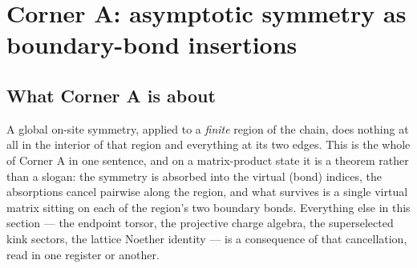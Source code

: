 
\providecommand{\PGL}{\operatorname{PGL}}      %
\providecommand{\PU}{\operatorname{PU}}        %
\providecommand{\GLie}{\operatorname{GL}}      %
\providecommand{\Ug}{\operatorname{U}}         %
\providecommand{\Hcoh}{\operatorname{H}}       %
\providecommand{\bond}[2]{(#1\,|\,#2)}         %
\providecommand{\Gdiag}{G_{\mathrm{diag}}}
\providecommand{\Aeff}{\A_{\mathrm{eff}}}      %
\providecommand{\chargealg}{\mathfrak{a}_\alpha} %
\providecommand{\bondcur}{\mathcal{J}}         %
\providecommand{\act}{\triangleright}          %

\section{Corner A: asymptotic symmetry as boundary-bond insertions}
\label{sec:corner-a}

\subsection{What Corner A is about}

A global on-site symmetry, applied to a \emph{finite} region of the chain, does
nothing at all in the interior of that region and everything at its two edges.
This is the whole of Corner A in one sentence, and on a matrix-product state it
is a theorem rather than a slogan: the symmetry is absorbed into the virtual
(bond) indices, the absorptions cancel pairwise along the region, and what
survives is a single virtual matrix sitting on each of the region's two boundary
bonds.  Everything else in this section --- the endpoint torsor, the projective
charge algebra, the superselected kink sectors, the lattice Noether identity ---
is a consequence of that cancellation, read in one register or another.

